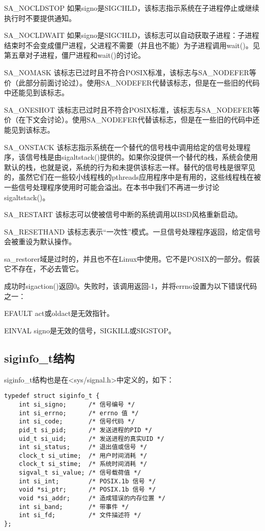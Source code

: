 \begin{eqlist*}
\item[SA\_NOCLDSTOP] 如果signo是SIGCHLD，该标志指示系统在子进程停止或继续执行时不要提供通知。
\item[SA\_NOCLDWAIT] 如果signo是SIGCHLD，该标志可以自动获取子进程：子进程结束时不会变成僵尸进程，父进程不需要（并且也不能）为子进程调用wait()。见第五章对子进程，僵尸进程和wait()的讨论。
\item[SA\_NOMASK] 该标志已过时且不符合POSIX标准，该标志与SA\_NODEFER等价（此部分前面讨论过）。使用SA\_NODEFER代替该标志，但是在一些旧的代码中还能见到该标志。
\item[SA\_ONESHOT] 该标志已过时且不符合POSIX标准，该标志与SA\_NODEFER等价（在下文会讨论）。使用SA\_NODEFER代替该标志，但是在一些旧的代码中还能见到该标志。
\item[SA\_ONSTACK] 该标志指示系统在一个替代的信号栈中调用给定的信号处理程序，该信号栈是由sigaltstack()提供的。如果你没提供一个替代的栈，系统会使用默认的栈，也就是说，系统的行为和未提供该标志一样。替代的信号栈是很罕见的，虽然它们在一些较小线程栈的pthreads应用程序中是有用的，这些线程栈在被一些信号处理程序使用时可能会溢出。在本书中我们不再进一步讨论sigaltstack()。
\item[SA\_RESTART] 该标志可以使被信号中断的系统调用以BSD风格重新启动。
\item[SA\_RESETHAND] 该标志表示“一次性”模式。一旦信号处理程序返回，给定信号会被重设为默认操作。
\end{eqlist*}

sa\_restorer域是过时的，并且也不在Linux中使用。它不是POSIX的一部分。假装它不存在，不必去管它。

成功时sigaction()返回0。失败时，该调用返回-1，并将errno设置为以下错误代码之一：

\begin{eqlist*}
\item[EFAULT] act或oldact是无效指针。
\item[EINVAL] signo是无效的信号，SIGKILL或SIGSTOP。
\end{eqlist*}
\subsection{siginfo\_t结构}

siginfo\_t结构也是在<sys/signal.h>中定义的，如下：

\begin{lstlisting}
typedef struct siginfo_t {
    int si_signo;      /* 信号编号 */
    int si_errno;      /* errno 值 */
    int si_code;       /* 信号代码 */
    pid_t si_pid;      /* 发送进程的PID */
    uid_t si_uid;      /* 发送进程的真实UID */
    int si_status;     /* 退出值或信号 */
    clock_t si_utime;  /* 用户时间消耗 */
    clock_t si_stime;  /* 系统时间消耗 */
    sigval_t si_value; /* 信号载荷值 */
    int si_int;        /* POSIX.1b 信号 */
    void *si_ptr;      /* POSIX.1b 信号 */
    void *si_addr;     /* 造成错误的内存位置 */
    int si_band;       /* 带事件 */
    int si_fd;         /* 文件描述符 */
};
\end{lstlisting}

